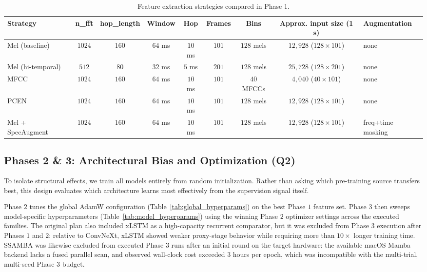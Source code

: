 \documentclass[cameraready]{Interspeech}
\begin{document}
\begin{table}[h]
\centering
\caption{Feature extraction strategies compared in Phase $1$.}
\label{tab:feature_strategies}
\scriptsize
\begingroup\setlength{\tabcolsep}{4pt}
\begin{tabularx}{0.8\textwidth}{@{} l c c c c c c c X@{}}
\toprule
Strategy & n\_fft & hop\_length & Window & Hop & Frames & Bins & Approx. input size (1 s) & Augmentation \\
\midrule
Mel (baseline) & $1024$ & $160$ & $64$ ms & $10$ ms & $101$ & $128$ mels & $12{,}928$ ($128\times101$) & none \\
Mel (hi-temporal) & $512$ & $80$ & $32$ ms & $5$ ms & $201$ & $128$ mels & $25{,}728$ ($128\times201$) & none \\
MFCC & $1024$ & $160$ & $64$ ms & $10$ ms & $101$ & $40$ MFCCs & $4{,}040$ ($40\times101$) & none \\
PCEN & $1024$ & $160$ & $64$ ms & $10$ ms & $101$ & $128$ mels & $12{,}928$ ($128\times101$) & none \\
Mel + SpecAugment & $1024$ & $160$ & $64$ ms & $10$ ms & $101$ & $128$ mels & $12{,}928$ ($128\times101$) & freq+time masking \\
\bottomrule
\end{tabularx}
\endgroup
\end{table}

\subsection{Phases 2 \& 3: Architectural Bias and Optimization (Q2)}
To isolate structural effects, we train all models entirely from random initialization. Rather than asking which pre-training source transfers best, this design evaluates which architecture learns most effectively from the supervision signal itself.

Phase $2$ tunes the global AdamW configuration (Table~\ref{tab:global_hyperparams}) on the best Phase $1$ feature set. Phase $3$ then sweeps model-specific hyperparameters (Table~\ref{tab:model_hyperparams}) using the winning Phase $2$ optimizer settings across the executed families. The original plan also included xLSTM as a high-capacity recurrent comparator, but it was excluded from Phase $3$ execution after Phases $1$ and $2$: relative to ConvNeXt, xLSTM showed weaker proxy-stage behavior while requiring more than $10\times$ longer training time. SSAMBA was likewise excluded from executed Phase $3$ runs after an initial round on the target hardware: the available macOS Mamba backend lacks a fused parallel scan, and observed wall-clock cost exceeded $3$ hours per epoch, which was incompatible with the multi-trial, multi-seed Phase $3$ budget.
\end{document}
